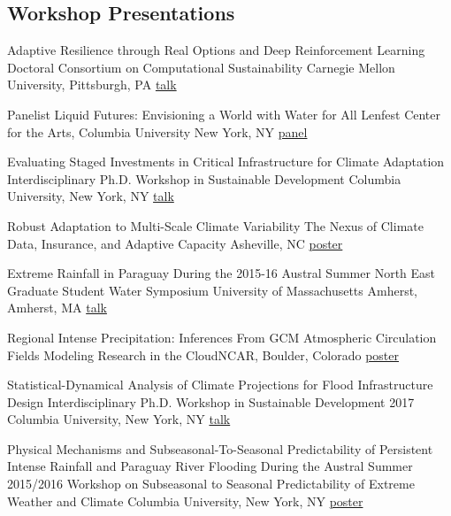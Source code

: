 \subsection{Workshop Presentations}

{Adaptive Resilience through Real Options and Deep Reinforcement Learning}
{Doctoral Consortium on Computational Sustainability}
{Carnegie Mellon University, Pittsburgh, PA}
{\href{https://www.compsust.net/compsust-2019/}{talk}}
{}

{Panelist}
{Liquid Futures: Envisioning a World with Water for All}
{Lenfest Center for the Arts, Columbia University}
{New York, NY}
{\href{https://lenfest.arts.columbia.edu/events/liquid-futures-envisioning-world-water-all-fall-2019}{panel}}
{}

{Evaluating Staged Investments in Critical Infrastructure for Climate Adaptation}
{Interdisciplinary Ph.D. Workshop in Sustainable Development}
{Columbia University, New York, NY}
{\href{https://doi.org/10.6084/m9.figshare.8277017.v1}{talk}}
{}

{Robust Adaptation to Multi-Scale Climate Variability}
{The Nexus of Climate Data, Insurance, and Adaptive Capacity}
{Asheville, NC}
{\href{https://doi.org/10.6084/m9.figshare.8277017.v1}{poster}}
{}

{Extreme Rainfall in Paraguay During the 2015-16 Austral Summer}
{North East Graduate Student Water Symposium}
{University of Massachusetts Amherst, Amherst, MA}
{\href{https://doi.org/10.6084/m9.figshare.8277167.v1}{talk}}
{}

{Regional Intense Precipitation:  Inferences From GCM Atmospheric Circulation Fields}
{Modeling Research in the Cloud}{NCAR, Boulder, Colorado}
{\href{https://doi.org/10.6084/m9.figshare.8277167.v1}{poster}}
{}

{Statistical-Dynamical Analysis of Climate Projections for Flood Infrastructure Design}
{Interdisciplinary Ph.D. Workshop in Sustainable Development 2017}
{Columbia University, New York, NY}
{\href{http://blogs.cuit.columbia.edu/sdds/ipwsd/interdisciplinary-ph-d-workshop-in-sustainable-development-2017/ipwsd-2017-schedule/}{talk}}
{}

{Physical Mechanisms and Subseasonal-To-Seasonal Predictability of Persistent Intense Rainfall and Paraguay River Flooding During the Austral Summer 2015/2016}
{Workshop on Subseasonal to Seasonal Predictability of Extreme Weather and Climate}
{Columbia University, New York, NY}
{\href{https://doi.org/10.13140/RG.2.2.24104.57607}{poster}}
{}
